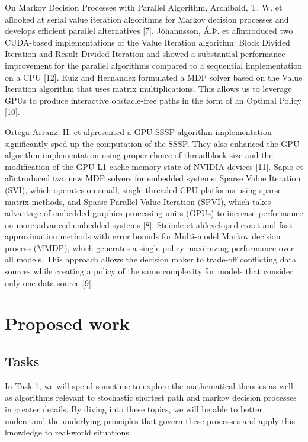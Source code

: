 \documentclass{article}
\begin{document}
On Markov Decision Processes with Parallel Algorithm, Archibald, T. W. et al\. looked at serial value iteration algorithms for Markov decision processes and develops efficient parallel alternatives [7]. 
Jóhannsson, Á.Þ. et al\. introduced two CUDA-based implementations of the Value Iteration algorithm: Block Divided Iteration and Result Divided Iteration 
and showed a substantial performance improvement for the parallel algorithms compared to a sequential implementation 
on a CPU [12]. Ruiz and Hernandez formulated a MDP solver based on the Value Iteration algorithm that uses matrix 
multiplications. This allows us to leverage GPUs to produce interactive obstacle-free paths in the form of an Optimal Policy [10]. 

Ortega-Arranz, H. et al\. presented a GPU SSSP algorithm implementation  significantly sped up the computation of the SSSP. They also enhanced the GPU 
algorithm implementation using proper choice of threadblock size and the modification of the GPU L1 cache memory state of 
NVIDIA devices [11]. Sapio et al\. introduced two new MDP solvers for embedded 
systems: Sparse Value Iteration (SVI), which operates on small, single-threaded CPU platforms using sparse matrix methods, 
and Sparse Parallel Value Iteration (SPVI), which takes advantage of embedded graphics processing units (GPUs) to increase 
performance on more advanced embedded systems [8]. Steimle et al\. developed exact and fast approximation methods with error bounds 
for Multi-model Markov decision process (MMDP), which generates a single policy maximizing performance over all models. 
This approach allows the decision maker to trade-off conflicting data sources while creating a policy of the same complexity 
for models that consider only one data source [9].

\section{Proposed work}

\subsection{Tasks}

In Task 1, we will spend sometime to explore the mathematical theories as well as algorithms 
relevant to stochastic shortest path and markov decision processes in greater details. 
By diving into these topics, we will be able to better understand the underlying principles 
that govern these processes and apply this knowledge to real-world situations. 
\end{document}
